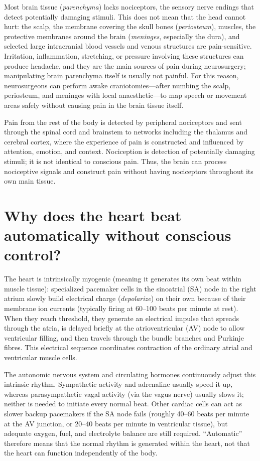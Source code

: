 \documentclass[11pt,oneside]{report}
\begin{document}
Most brain tissue (\emph{parenchyma}) lacks nociceptors, the sensory nerve
endings that detect potentially damaging stimuli. This does not mean that the
head cannot hurt: the scalp, the membrane covering the skull bones
(\emph{periosteum}), muscles, the protective membranes around the brain
(\emph{meninges}, especially the dura), and selected large intracranial blood
vessels and venous structures are pain-sensitive.
Irritation, inflammation, stretching, or pressure involving these structures
can produce headache, and they are the main sources of pain during
neurosurgery; manipulating brain parenchyma itself is usually not painful. For
this reason, neurosurgeons can perform awake craniotomies---after numbing the
scalp, periosteum, and meninges with local anaesthetic---to map speech or
movement areas safely without causing pain in the brain tissue itself.

Pain from the rest of the body is detected by peripheral nociceptors and sent
through the spinal cord and brainstem to networks including the thalamus and
cerebral cortex, where the experience of pain is constructed and influenced by
attention, emotion, and context. Nociception is detection of potentially
damaging stimuli; it is not identical to conscious pain. Thus, the brain can
process nociceptive signals and construct pain without having nociceptors
throughout its own main tissue.

\section{Why does the heart beat automatically without conscious control?}

The heart is intrinsically myogenic (meaning it generates its own beat within
muscle tissue): specialized pacemaker cells in the sinoatrial (SA) node in the
right atrium slowly build electrical charge (\emph{depolarize}) on their own
because of their membrane ion currents (typically firing at 60--100 beats per
minute at rest). When they reach threshold, they generate an
electrical impulse that spreads through the atria, is delayed briefly at the
atrioventricular (AV) node to allow ventricular filling, and then travels
through the bundle branches and Purkinje fibres. This electrical sequence
coordinates contraction of the ordinary atrial and ventricular muscle cells.

The autonomic nervous system and circulating hormones continuously adjust this
intrinsic rhythm. Sympathetic activity and adrenaline usually speed it up,
whereas parasympathetic vagal activity (via the vagus nerve) usually slows it;
neither is needed to initiate every normal beat. Other cardiac cells can act as
slower backup pacemakers if the SA node fails (roughly 40--60 beats per minute
at the AV junction, or 20--40 beats per minute in ventricular tissue), but
adequate oxygen, fuel, and electrolyte balance are still required. ``Automatic'' therefore means that the normal rhythm
is generated within the heart, not that the heart can function independently of
the body.
\end{document}
